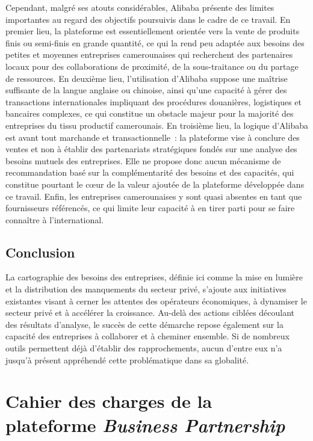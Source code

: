 \documentclass[12pt, a4paper, oneside]{report}
\begin{document}
Cependant, malgré ses atouts considérables, Alibaba présente des
limites importantes au regard des objectifs poursuivis dans le cadre
de ce travail. En premier lieu, la plateforme est essentiellement
orientée vers la vente de produits finis ou semi-finis en grande
quantité, ce qui la rend peu adaptée aux besoins des petites et
moyennes entreprises camerounaises qui recherchent des partenaires
locaux pour des collaborations de proximité, de la sous-traitance
ou du partage de ressources. En deuxième lieu, l'utilisation
d'Alibaba suppose une maîtrise suffisante de la langue anglaise
ou chinoise, ainsi qu'une capacité à gérer des transactions
internationales impliquant des procédures douanières, logistiques
et bancaires complexes, ce qui constitue un obstacle majeur pour
la majorité des entreprises du tissu productif camerounais. En
troisième lieu, la logique d'Alibaba est avant tout marchande et
transactionnelle~: la plateforme vise à conclure des ventes et non
à établir des partenariats stratégiques fondés sur une analyse des
besoins mutuels des entreprises. Elle ne propose donc aucun mécanisme
de recommandation basé sur la complémentarité des besoins et des
capacités, qui constitue pourtant le c\oe ur de la valeur ajoutée de
la plateforme développée dans ce travail. Enfin, les entreprises
camerounaises y sont quasi absentes en tant que fournisseurs référencés,
ce qui limite leur capacité à en tirer parti pour se faire connaître
à l'international.

\section*{Conclusion}

La cartographie des besoins des entreprises, définie ici comme la mise en lumière et la distribution des manquements du secteur privé, s'ajoute aux initiatives existantes visant à cerner les attentes des opérateurs économiques, à dynamiser le secteur privé et à accélérer la croissance. Au-delà des actions ciblées découlant des résultats d'analyse, le succès de cette démarche repose également sur la capacité des entreprises à collaborer et à cheminer ensemble. Si de nombreux outils permettent déjà d'établir des rapprochements, aucun d'entre eux n'a jusqu'à présent appréhendé cette problématique dans sa globalité.
	\chapter{Cahier des charges de la plateforme
		\textit{Business Partnership}}
	\label{chap:cahier_charges}
	
\end{document}

